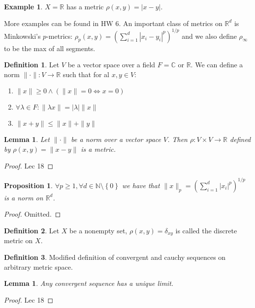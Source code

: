 \documentclass{article}
\newcommand\N{\ensuremath{\mathbb{N}}}
\newcommand\R{\ensuremath{\mathbb{R}}}
\newcommand\C{\ensuremath{\mathbb{C}}}
\newtheorem{lemma}[theorem]{Lemma}
\theoremstyle{definition}
\newtheorem{definition}{Definition}[subsection]
\newtheorem{eg}{Example}[subsection]
\theoremstyle{remark}
\theoremstyle{plain}
\newtheorem{prop}{Proposition}[subsection]
\begin{document}
\begin{eg}
    \(X = \R\) has a metric \(\rho(x,y) = |x-y|\).
\end{eg}

More examples can be found in HW 6. An important class of metrics on \(\R^d\) is Minkowski's \(p\)-metrics: 
\(\rho_p(x,y) = (\sum\limits_{i = 1}^d |x_i - y_i|^p)^{1/p}\) and we also define \(\rho_{\infty}\) to be the max of all segments. 

\begin{definition}
    Let \(V\) be a vector space over a field \(F = \C\) or \(\R\). We can define a norm \(\|\cdot \|: V \to \R \) such that for al \(x,y \in V\):
    \begin{enumerate}
        \item \(\| x \| \geq 0 \land (\| x \| = 0 \iff x = 0)\)
        \item \(\forall \lambda \in F: \|\lambda x \| = |\lambda| \| x\| \)
        \item \(\|x+y\| \leq \|x\| + \|y\|\)
    \end{enumerate}
\end{definition}

\begin{lemma}
    Let \(\|\cdot\|\) be a norm over a vector space \(V\). Then \(\rho: V \times V \to \R\) defined by \(\rho(x,y) = \|x-y\|\) is a metric.
\end{lemma}
\begin{proof}
    Lec 18
\end{proof}
\begin{prop}
    \(\forall p \geq 1, \forall d \in \N\setminus \left\{ 0 \right\}\) we have that \(\|x \|_p = (\sum\limits_{i =1}^d |x_i|^p)^{1/p}\) is a norm on \(\R^d\).
\end{prop}
\begin{proof}
    Omitted. 
\end{proof}

\begin{definition}
    Let \(X\) be a nonempty set, \(\rho(x,y) = \delta_{xy}\) is called the discrete metric on \(X\).
\end{definition}

\begin{definition}
    Modified definition of convergent and cauchy sequences on arbitrary metric space. 
\end{definition}

\begin{lemma}
    Any convergent sequence has a unique limit.
\end{lemma}
\begin{proof}
    Lec 18
\end{proof}
\end{document}
